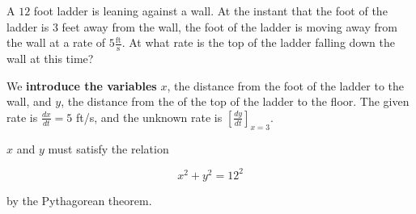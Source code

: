 \documentclass{ximera}
\author{Steven Gubkin\and Nela Lakos}
\begin{document}
\begin{exercise}


A $12$ foot ladder is leaning against a wall.  At the instant that the foot of the ladder is $3$ feet away from the wall, the foot of the ladder is moving away from the wall at a rate of $5 \frac{\textrm{ft}}{\textrm{s}}$.  At what rate is the top of the ladder falling down the wall at this time?

\begin{hint}
We \textbf{introduce the variables}  $x$, the distance from  the foot of the ladder to the wall, and $y$, the distance from the of the top of the ladder to the floor. The given rate is $\frac{dx}{dt}=5$ ft/s, and the unknown rate is $\left[\frac{dy}{dt}\right]_{x=3}$. 
\end{hint}
\begin{hint}

\end{hint}
  \begin{image}
    \end{image}

\begin{hint}
	$x$ and $y$ must satisfy the relation

\[
x^2 + y^2 = 12^2
\]

by the Pythagorean theorem.
\end{hint}


\end{exercise}
\end{document}
